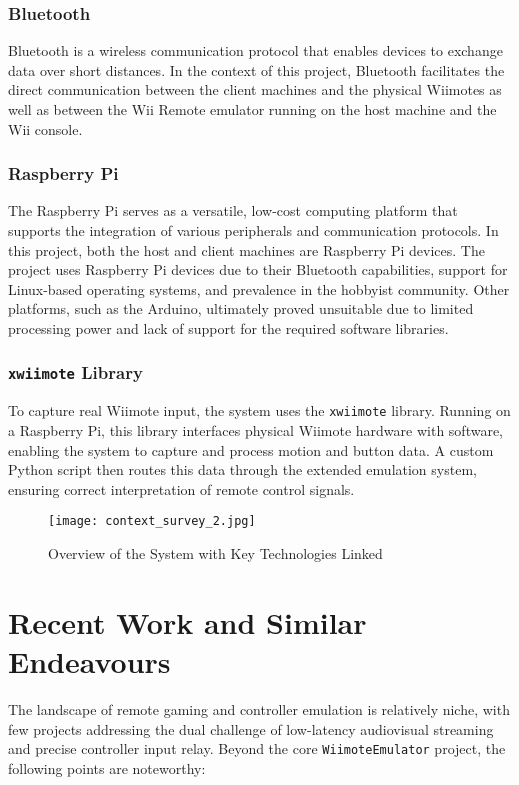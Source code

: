 \subsubsection{Bluetooth}
Bluetooth is a wireless communication protocol that enables devices to exchange data over short distances.  In the context of this project, Bluetooth facilitates the direct communication between the client machines and the physical Wiimotes as well as between the Wii Remote emulator running on the host machine and the Wii console.

\subsubsection{Raspberry Pi}
The Raspberry Pi serves as a versatile, low-cost computing platform that supports the integration of various peripherals and communication protocols. In this project, both the host and client machines are Raspberry Pi devices. The project uses Raspberry Pi devices due to their Bluetooth capabilities, support for Linux-based operating systems, and prevalence in the hobbyist community. Other platforms, such as the Arduino, ultimately proved unsuitable due to limited processing power and lack of support for the required software libraries.

\subsubsection{\texttt{xwiimote} Library\cite{xwiimote}}
To capture real Wiimote input, the system uses the \texttt{xwiimote} library. Running on a Raspberry Pi, this library interfaces physical Wiimote hardware with software, enabling the system to capture and process motion and button data. A custom Python script then routes this data through the extended emulation system, ensuring correct interpretation of remote control signals.

\begin{figure}[ht]
	\centering
	\texttt{[image: context\_survey\_2.jpg]}
	\caption{Overview of the System with Key Technologies Linked}
	\label{fig:context_survey}
\end{figure}



\section{Recent Work and Similar Endeavours}

The landscape of remote gaming and controller emulation is relatively niche, with few projects addressing the dual challenge of low-latency audiovisual streaming and precise controller input relay. Beyond the core \texttt{WiimoteEmulator} project, the following points are noteworthy:

